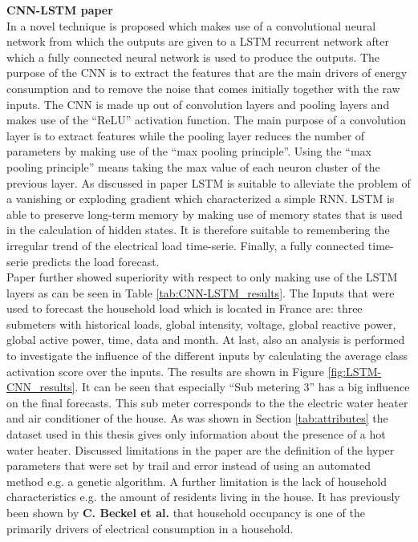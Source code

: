 \textbf{CNN-LSTM paper}\\
In \cite{Kim2019} a novel technique is proposed which makes use of a convolutional neural network from which the outputs are given to a LSTM recurrent network after which a fully connected neural network  is used to produce the outputs. The purpose of the CNN is to extract the features that are the main drivers of energy consumption and to remove the noise that comes initially together with the raw inputs. The CNN is made up out of convolution layers and pooling layers and makes use of the ``ReLU'' activation function. The main purpose of a convolution layer is to extract features while the pooling layer reduces the number of parameters by making use of the ``max pooling principle''. Using the ``max pooling principle'' means taking the max value of each neuron cluster of the previous layer. As discussed in paper \cite{Kong2019} LSTM is suitable to alleviate the problem of a vanishing or exploding gradient which characterized a simple RNN. LSTM is able to preserve long-term memory by making use of memory states that is used in the calculation of hidden states. It is therefore suitable to remembering the irregular trend of the electrical load time-serie. Finally, a fully connected time-serie predicts the load forecast.\\
Paper \cite{Kim2019} further showed superiority with respect to only making use of the LSTM layers as can be seen in Table \ref{tab:CNN-LSTM_results}. The  Inputs that were used to forecast the household load which is located in France are: three submeters with historical loads, global intensity, voltage, global reactive power, global active power, time, data and month. 
At last, also an analysis is performed to investigate the influence of the different inputs by calculating the average class activation score over the inputs. The results are shown in Figure \ref{fig:LSTM-CNN_results}. It can be seen that especially ``Sub metering $ 3 $'' has a big influence on the final forecasts. This sub meter corresponds to the the electric water heater and air conditioner of the house. As was shown in Section \ref{tab:attributes} the dataset used in this thesis gives only information about the presence of a hot water heater.  Discussed limitations in the paper are the definition of the hyper parameters that were set by trail and error instead of using an automated method e.g. a genetic algorithm. A further limitation is the lack of household characteristics e.g. the amount of residents living in the house. It has previously been shown by \textbf{C. Beckel et al.} that household occupancy is one of the primarily drivers of electrical consumption in a household.\\

